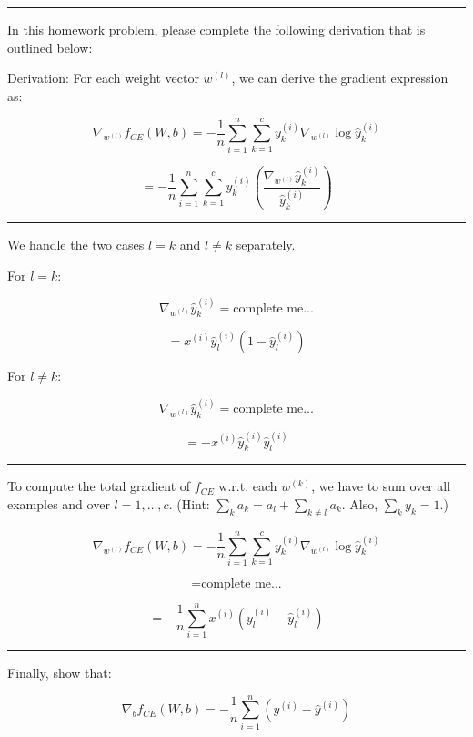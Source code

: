 \documentclass[
  letterpaper,
  DIV=11,
  numbers=noendperiod]{scrartcl}
\begin{document}
\begin{center}\rule{0.5\linewidth}{0.5pt}\end{center}

In this homework problem, please complete the following derivation that
is outlined below:

Derivation: For each weight vector \(w^{(l)}\), we can derive the
gradient expression as:

\[
\nabla_{w^{(l)}} f_{CE}(W,b) = -\frac{1}{n} \sum_{i=1}^n \sum_{k=1}^c y_k^{(i)} \nabla_{w^{(l)}} \log \hat{y}_k^{(i)}
\]

\[
= -\frac{1}{n} \sum_{i=1}^n \sum_{k=1}^c y_k^{(i)} \left( \frac{\nabla_{w^{(l)}} \hat{y}_k^{(i)}}{\hat{y}_k^{(i)}} \right)
\]

\begin{center}\rule{0.5\linewidth}{0.5pt}\end{center}

We handle the two cases \(l = k\) and \(l \neq k\) separately.

For \(l = k\):

\[
\nabla_{w^{(l)}} \hat{y}_k^{(i)} = \text{complete me...}
\]

\[
= x^{(i)} \hat{y}_l^{(i)} (1 - \hat{y}_l^{(i)})
\]

For \(l \neq k\):

\[
\nabla_{w^{(l)}} \hat{y}_k^{(i)} = \text{complete me...}
\]

\[
= -x^{(i)} \hat{y}_k^{(i)} \hat{y}_l^{(i)}
\]

\begin{center}\rule{0.5\linewidth}{0.5pt}\end{center}

To compute the total gradient of \(f_{CE}\) w.r.t. each \(w^{(k)}\), we
have to sum over all examples and over \(l = 1, \ldots, c\). (Hint:
\(\sum_k a_k = a_l + \sum_{k \neq l} a_k.\) Also, \(\sum_k y_k = 1.\))

\[
\nabla_{w^{(l)}} f_{CE}(W,b) = -\frac{1}{n} \sum_{i=1}^n \sum_{k=1}^c y_k^{(i)} \nabla_{w^{(l)}} \log \hat{y}_k^{(i)}
\]

\[
= \text{complete me...}
\]

\[
= -\frac{1}{n} \sum_{i=1}^n x^{(i)} \left( y_l^{(i)} - \hat{y}_l^{(i)} \right)
\]

\begin{center}\rule{0.5\linewidth}{0.5pt}\end{center}

Finally, show that:

\[
\nabla_b f_{CE}(W,b) = -\frac{1}{n} \sum_{i=1}^n \left( y^{(i)} - \hat{y}^{(i)} \right)
\]
\end{document}

